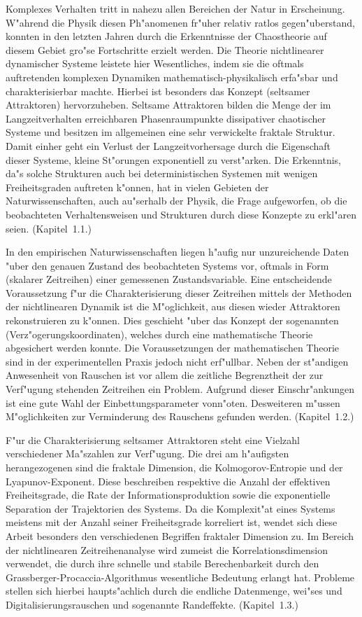 
Komplexes Verhalten tritt in nahezu allen Bereichen der Natur in Erscheinung. W"ahrend die
Physik diesen Ph"anomenen fr"uher relativ ratlos gegen"uberstand, konnten in den letzten
Jahren durch die Erkenntnisse der Chaostheorie auf diesem Gebiet gro"se Fortschritte
erzielt werden. Die Theorie nichtlinearer dynamischer Systeme leistete hier Wesentliches,
indem sie die oftmals auftretenden komplexen Dynamiken mathematisch-physikalisch erfa"sbar
und charakterisierbar machte.  Hierbei ist besonders das Konzept \begriff(seltsamer Attraktoren)
hervorzuheben.  Seltsame Attraktoren bilden die Menge der im Langzeitverhalten
erreichbaren Phasenraumpunkte dissipativer chaotischer Systeme und besitzen im allgemeinen
eine sehr verwickelte fraktale Struktur. Damit einher geht ein Verlust der Langzeitvorhersage
durch die Eigenschaft dieser Systeme, kleine St"orungen exponentiell zu verst"arken.  Die
Erkenntnis, da"s solche Strukturen auch bei deterministischen Systemen mit wenigen
Freiheitsgraden auftreten k"onnen, hat in vielen Gebieten der Naturwissenschaften, auch
au"serhalb der Physik, die Frage aufgeworfen, ob die beobachteten Verhaltensweisen und
Strukturen durch diese Konzepte zu erkl"aren seien. (Kapitel~1.1.)


In den empirischen Naturwissenschaften liegen h"aufig nur unzureichende Daten "uber den
genauen Zustand des beobachteten Systems vor, oftmals in Form \begriff(skalarer
Zeitreihen) einer gemessenen Zustandsvariable.  Eine entscheidende Voraussetzung f"ur die
Charakterisierung dieser Zeitreihen mittels der Methoden der nichtlinearen Dynamik ist
die M"oglichkeit, aus diesen wieder Attraktoren rekonstruieren zu k"onnen.  Dies geschieht
"uber das Konzept der sogenannten \begriff(Verz"ogerungskoordinaten), welches durch eine
mathematische Theorie abgesichert werden konnte. Die Voraussetzungen der mathematischen
Theorie sind in der experimentellen Praxis jedoch nicht erf"ullbar. Neben der st"andigen
Anwesenheit von Rauschen ist vor allem die zeitliche Begrenztheit der zur Verf"ugung
stehenden Zeitreihen ein Problem. Aufgrund dieser Einschr"ankungen ist eine gute Wahl der
Einbettungsparameter vonn"oten.  Desweiteren m"ussen M"oglichkeiten zur Verminderung des
Rauschens gefunden werden. (Kapitel~1.2.)

F"ur die Charakterisierung seltsamer Attraktoren steht eine Vielzahl verschiedener Ma"szahlen zur
Verf"ugung. Die drei am h"aufigsten herangezogenen sind die fraktale Dimension, die
Kolmogorov-Entropie und der Lyapunov-Exponent. Diese beschreiben respektive die Anzahl
der effektiven Freiheitsgrade, die Rate der Informationsproduktion sowie die exponentielle
Separation der Trajektorien des Systems. Da die Komplexit"at eines Systems meistens mit
der Anzahl seiner Freiheitsgrade korreliert ist, wendet sich diese Arbeit besonders den
verschiedenen Begriffen fraktaler Dimension zu.  Im Bereich der nichtlinearen
Zeitreihenanalyse wird zumeist die Korrelationsdimension verwendet, die durch ihre schnelle
und stabile Berechenbarkeit durch den Grassberger-Procaccia-Algorithmus wesentliche
Bedeutung erlangt hat. Probleme stellen sich hierbei haupts"achlich durch die endliche
Datenmenge, wei"ses und Digitalisierungsrauschen und sogenannte Randeffekte.  (Kapitel~1.3.)


